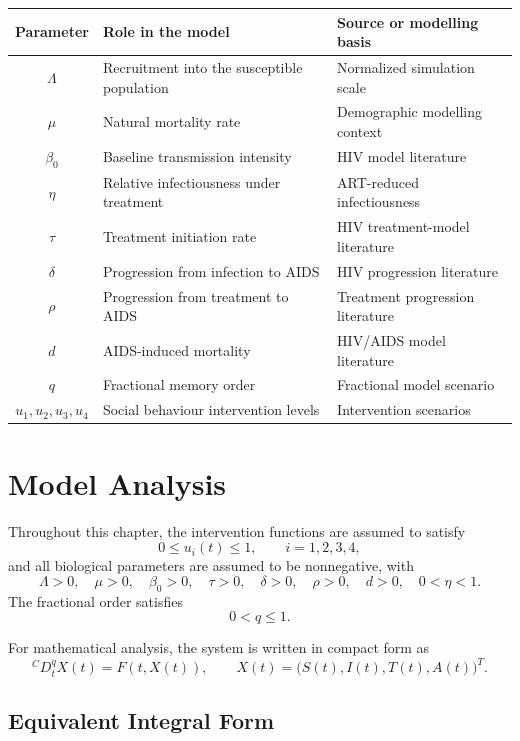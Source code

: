 \documentclass[12pt,a4paper,oneside]{report}
\newcommand{\CaputoD}[2]{{}^{C}D_{#1}^{#2}}
\begin{document}
\begin{center}
\renewcommand{\arraystretch}{1.25}
\begin{tabular}{>{\bfseries}c p{6.2cm}p{4.1cm}}
\toprule
Parameter & Role in the model & Source or modelling basis\\
\midrule
$\Lambda$ & Recruitment into the susceptible population & Normalized simulation scale\\
$\mu$ & Natural mortality rate & Demographic modelling context\\
$\beta_0$ & Baseline transmission intensity & HIV model literature\\
$\eta$ & Relative infectiousness under treatment & ART-reduced infectiousness\\
$\tau$ & Treatment initiation rate & HIV treatment-model literature\\
$\delta$ & Progression from infection to AIDS & HIV progression literature\\
$\rho$ & Progression from treatment to AIDS & Treatment progression literature\\
$d$ & AIDS-induced mortality & HIV/AIDS model literature\\
$q$ & Fractional memory order & Fractional model scenario\\
$u_1,u_2,u_3,u_4$ & Social behaviour intervention levels & Intervention scenarios\\
\bottomrule
\end{tabular}
\end{center}

\chapter{Model Analysis}

Throughout this chapter, the intervention functions are assumed to satisfy
\[
0\leq u_i(t)\leq 1,\qquad i=1,2,3,4,
\]
and all biological parameters are assumed to be nonnegative, with
\[
\Lambda>0,\quad \mu>0,\quad \beta_0>0,\quad \tau>0,\quad \delta>0,\quad \rho>0,\quad d>0,\quad 0<\eta<1.
\]
The fractional order satisfies
\[
0<q\leq 1.
\]

For mathematical analysis, the system is written in compact form as
\[
\CaputoD{t}{q}X(t)=F(t,X(t)),
\qquad
X(t)=\bigl(S(t),I(t),T(t),A(t)\bigr)^T.
\]

\section{Equivalent Integral Form}
\end{document}
